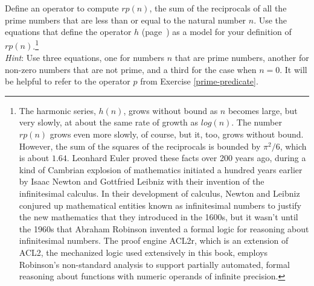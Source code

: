 \begin{ExerciseList}
\Exercise Define an operator to compute $rp(n)$,
the sum of the reciprocals of all the prime numbers that are less than or equal to
the natural number $n$.
Use the equations that define the operator
$h$ (page~\pageref{reciprocalsdef})
as a model for your definition of $rp(n)$.\footnote{The
harmonic series, $h(n)$,
grows without bound as $n$ becomes large,
but very slowly, at about the same rate of growth as $log(n)$.
The number $rp(n)$ grows even more slowly, of course,
but it, too, grows without bound.
However, the sum of the squares of the reciprocals is bounded
by $\pi^2/6$, which is about $1.64$.
Leonhard Euler proved these facts over 200 years ago, during
a kind of Cambrian explosion of mathematics initiated a hundred years earlier
by Isaac Newton and Gottfried Leibniz
with their invention of the infinitesimal calculus.
In their development of calculus,
Newton and Leibniz conjured up mathematical entities known as infinitesimal numbers
to justify the new mathematics that they introduced in the 1600s,
but it wasn't until the 1960s that Abraham Robinson invented a formal logic
for reasoning about infinitesimal numbers.
The proof engine ACL2r, which is an extension of ACL2,
the mechanized logic used extensively in this book,
employs Robinson's non-standard analysis
to support partially automated, formal reasoning about functions with
numeric operands of infinite precision.}\\
\emph{Hint}: Use three equations, one for numbers $n$ that are prime numbers,
another for non-zero numbers that are not prime,
and a third for the case when $n = 0$.
It will be helpful to refer to the operator $p$ from Exercise \ref{prime-predicate}.
\end{ExerciseList}



